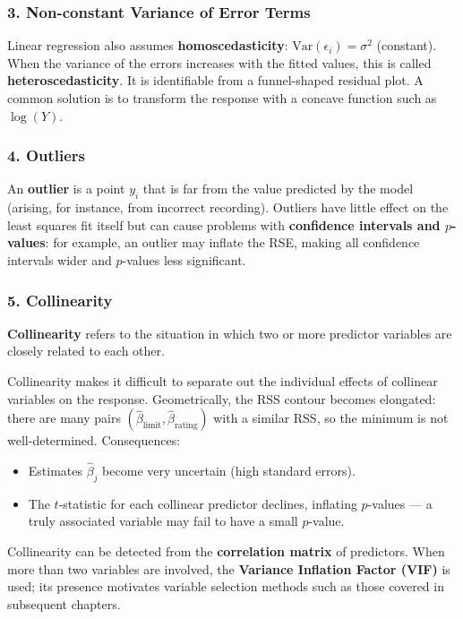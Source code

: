 \documentclass[11pt,a4paper]{article}
\theoremstyle{definition}
\theoremstyle{plain}
\theoremstyle{remark}
\begin{document}
\subsubsection{3. Non-constant Variance of Error Terms}

Linear regression also assumes \textbf{homoscedasticity}: $\mathrm{Var}(\epsilon_i) = \sigma^2$ (constant). When the variance of the errors increases with the fitted values, this is called \textbf{heteroscedasticity}. It is identifiable from a funnel-shaped residual plot. A common solution is to transform the response with a concave function such as $\log(Y)$.

\subsubsection{4. Outliers}

An \textbf{outlier} is a point $y_i$ that is far from the value predicted by the model (arising, for instance, from incorrect recording). Outliers have little effect on the least squares fit itself but can cause problems with \textbf{confidence intervals and $p$-values}: for example, an outlier may inflate the RSE, making all confidence intervals wider and $p$-values less significant.

\subsubsection{5. Collinearity}

\begin{tcolorbox}[colback=blue!5!white,colframe=blue!75!black,title=\textbf{Collinearity}]
\textbf{Collinearity} refers to the situation in which two or more predictor variables are closely related to each other.
\end{tcolorbox}

Collinearity makes it difficult to separate out the individual effects of collinear variables on the response. Geometrically, the RSS contour becomes elongated: there are many pairs $(\hat{\beta}_{\text{limit}}, \hat{\beta}_{\text{rating}})$ with a similar RSS, so the minimum is not well-determined. Consequences:
\begin{itemize}
    \item Estimates $\hat{\beta}_j$ become very uncertain (high standard errors).
    \item The $t$-statistic for each collinear predictor declines, inflating $p$-values — a truly associated variable may fail to have a small $p$-value.
\end{itemize}
Collinearity can be detected from the \textbf{correlation matrix} of predictors. When more than two variables are involved, the \textbf{Variance Inflation Factor (VIF)} is used; its presence motivates variable selection methods such as those covered in subsequent chapters.
\end{document}
